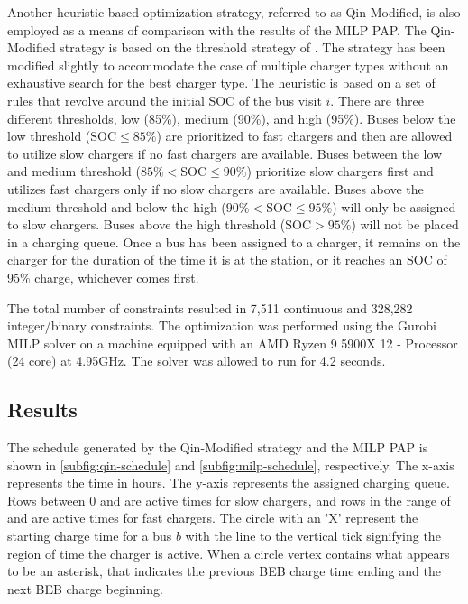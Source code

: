 \documentclass[ee,thesis]{usuthesis}
\newcommand{\fast}{15 }                                                         %
\newcommand{\slow}{15 }                                                         %
\newcommand{\contvars}{7,511 }
\newcommand{\intvars}{328,282 }
\newcommand{\timeran}{4.2 }                                                    %
\begin{document}
Another heuristic-based optimization strategy, referred to as Qin-Modified, is also employed as a means of comparison
with the results of the MILP PAP. The Qin-Modified strategy is based on the threshold strategy of
\cite{qin-2016-numer-analy}. The strategy has been modified slightly to accommodate the case of multiple charger types
without an exhaustive search for the best charger type. The heuristic is based on a set of rules that revolve around the
initial SOC of the bus visit \(i\). There are three different thresholds, low (85\%), medium (90\%), and
high (95\%). Buses below the low threshold (\(\text{SOC} \le 85\%\)) are prioritized to fast chargers and then are allowed to
utilize slow chargers if no fast chargers are available. Buses between the low and medium threshold (\(85\% < \text{SOC}
\le 90\%\)) prioritize slow chargers first and utilizes fast chargers only if no slow chargers are available. Buses above
the medium threshold and below the high (\(90\% < \text{SOC} \le 95\%\)) will only be assigned to slow chargers. Buses above
the high threshold (\(\text{SOC} > 95\%\)) will not be placed in a charging queue. Once a bus has been assigned to a
charger, it remains on the charger for the duration of the time it is at the station, or it reaches an SOC of 95\%
charge, whichever comes first.

The total number of constraints resulted in \contvars continuous and \intvars integer/binary constraints. The
optimization was performed using the Gurobi MILP solver \cite{gurobi-2021-gurob-optim} on a machine equipped with an
AMD Ryzen 9 5900X 12 - Processor (24 core) at 4.95GHz. The solver was allowed to run for \timeran seconds.

\subsection{Results}
\label{results}
The schedule generated by the Qin-Modified strategy and the MILP PAP is shown in \autoref{subfig:qin-schedule} and
\autoref{subfig:milp-schedule}, respectively. The x-axis represents the time in hours. The y-axis represents the
assigned charging queue. Rows between 0 and \fpeval{\slow - 1} are active times for slow chargers, and rows in the range
of \fpeval{\slow} and \fpeval{\fast + \slow - 1} are active times for fast chargers. The circle with an 'X' represent
the starting charge time for a bus \(b\) with the line to the vertical tick signifying the region of time the charger is
active. When a circle vertex contains what appears to be an asterisk, that indicates the previous BEB charge time ending
and the next BEB charge beginning.
\end{document}
